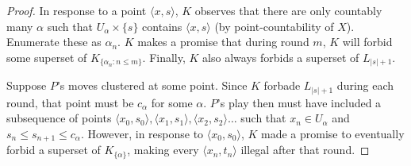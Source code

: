 \documentclass[11pt]{article}
\theoremstyle{plain}
\theoremstyle{definition}
\theoremstyle{remark}
\newcommand{\<}{\langle}
\renewcommand{\>}{\rangle}
\begin{document}
\begin{proof}
In response to a point $\<x,s\>$, $K$ observes that there are only countably many $\alpha$ such that $U_\alpha \times \{s\}$ contains $\<x,s\>$ (by point-countability of $X$). Enumerate these as $\alpha_n$. $K$ makes a promise that during round $m$, $K$ will forbid some superset of $K_{\{\alpha_n : n\leq m\}}$. Finally, $K$ also always forbids a superset of $L_{|s|+1}$.

Suppose $P$'s moves clustered at some point. Since $K$ forbade $L_{|s|+1}$ during each round, that point must be $c_\alpha$ for some $\alpha$. $P$'s play then must have included a subsequence of points $\<x_0,s_0\>,\<x_1,s_1\>,\<x_2,s_2\>\dots$ such that $x_n \in U_\alpha$ and $s_n \leq s_{n+1} \leq c_\alpha$. However, in response to $\<x_0,s_0\>$, $K$ made a promise to eventually forbid a superset of $K_{\{\alpha\}}$, making every $\<x_n,t_n\>$ illegal after that round.
\end{proof}
\end{document}
